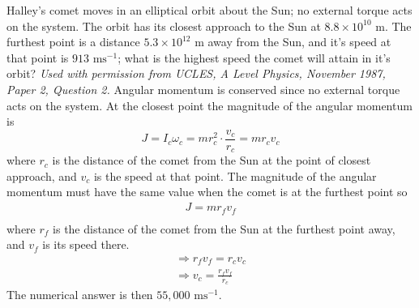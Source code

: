 \begin{problem} 
{Halley's comet moves in an elliptical orbit about the Sun; no external torque acts on the system. The orbit has its closest approach to the Sun at $8.8\times 10^{10}\textrm{ m}$. The furthest point is a distance $5.3\times 10^{12}\textrm{ m}$ away from the Sun, and it's speed at that point is  $913\textrm{ ms}^{-1}$; what is the highest speed the comet will attain in it's orbit?
}
{\textit{Used with permission from UCLES, A Level Physics, November 1987, Paper 2, Question 2.}}
{
Angular momentum is conserved since no external torque acts on the system. At the closest point the magnitude of the angular momentum is 
\begin{equation*}
J=I_c\omega_c=mr_c^2\cdot \frac{v_c}{r_c}=mr_cv_c
\end{equation*}
where $r_c$ is the distance of the comet from the Sun at the point of closest approach, and $v_c$ is the speed at that point. The magnitude of the angular momentum must have the same value when the comet is at the furthest point so 
\begin{align*}
J=mr_fv_f \\
\end{align*}
where $r_f$ is the distance of the comet from the Sun at the furthest point away, and $v_f$ is its speed there. 
\begin{align*}
\Rightarrow r_fv_f=r_cv_c \\
\Rightarrow v_c=\frac{r_f v_f}{r_c}
\end{align*}
The numerical answer is then $55,000\textrm{ ms}^{-1}$.
}
\end{problem}